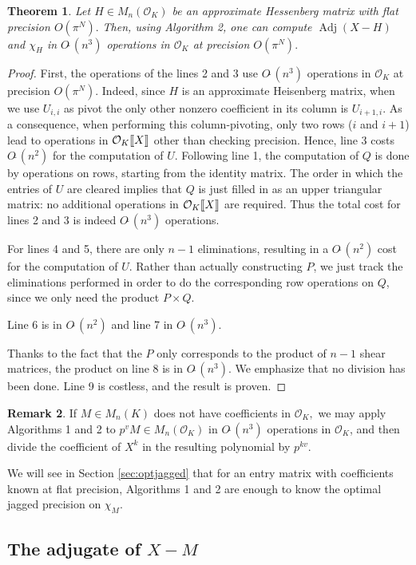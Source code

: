 \documentclass[sigconf]{acmart}
\DeclareMathOperator{\adj}{Adj}
\newcommand{\OK}{\mathcal{O}_K}
\newcommand{\llb}{[\mkern-2.5mu[}
\newcommand{\rrb}{]\mkern-2.5mu]}
\newcommand{\softO}{O\tilde{~}}
\newtheorem{theo}{Theorem}[section]
\theoremstyle{definition}
\newtheorem{rem}[theo]{Remark}
\begin{document}
\begin{theo}
Let $H \in M_n(\OK)$ be an approximate Hessenberg matrix with
flat precision $O(\pi^N).$
Then, using Algorithm 2, one can compute $\adj (X{-}H)$
and $\chi_H$ in 
$\softO (n^3)$ operations in $\OK$ at precision $O(\pi^N).$
\end{theo}
\begin{proof}
First, the operations of the lines 2 and 3 use $\softO (n^3)$ operations
in $\OK$ at precision $O(\pi^N).$
Indeed, since $H$ is an approximate Heisenberg matrix, when we use $U_{i,i}$ as pivot
the only other nonzero coefficient in its column is $U_{i+1,i}$.
As a consequence, when performing this column-pivoting, only two rows ($i$ and
$i+1$) lead to operations in $\OK \llb X \rrb$ other than checking precision.
Hence, line 3 costs $\softO (n^2)$ for the computation of $U.$
Following line 1, the computation of $Q$ is done by operations on rows, starting from the identity matrix.
The order in which the entries of $U$ are cleared implies that $Q$ is just filled in as an upper triangular matrix:
no additional operations in $\OK\llb X\rrb$ are required. Thus the total cost
for lines 2 and 3 is indeed $\softO (n^3)$ operations.

For lines 4 and 5, there are only $n{-}1$ eliminations, resulting in a $\softO (n^2)$ cost
for the computation of $U.$ Rather than actually constructing $P$, we just track the eliminations
performed in order to do the corresponding row operations on $Q$, since we only need the product $P \times Q$.

Line 6 is in $\softO (n^2)$ and line 7 in $\softO (n^3).$

Thanks to the fact that the $P$ only corresponds to the product of $n{-}1$ 
shear matrices, the
product on line 8 is in $\softO (n^3).$
We emphasize that no division has been done.
Line 9 is costless, and the result is proven.
\end{proof}
\begin{rem}
If $M \in M_n(K)$ does not have coefficients in $\OK,$
we may apply Algorithms 1 and 2 to $p^v M \in M_n(\OK)$
in $\softO (n^3)$ operations in $\OK$, and then divide
the coefficient of $X^k$ in the resulting polynomial by $p^{kv}$.
\end{rem}

We will see in Section \ref{sec:optjagged} that for an
entry matrix with coefficients known at flat precision,
Algorithms 1 and 2 are enough to
know the optimal jagged precision on $\chi_M.$

\subsection{The adjugate of $X{-}M$}
\end{document}

